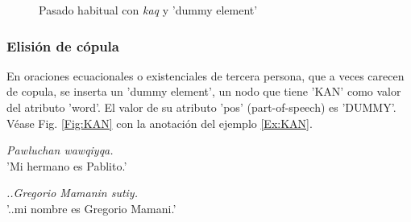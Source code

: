 \documentclass[a4paper,11pt,DIV12]{scrartcl}
\begin{document}
\begin{figure}
 \begin{center}
\end{center}
\caption{Pasado habitual con {\em kaq} y 'dummy element'}\label{Fig:kaqKAN}
\end{figure}





\subsubsection{Elisi\'on de c\'opula}
En oraciones ecuacionales o existenciales de tercera persona, que a veces carecen de copula, se inserta un 'dummy element', un nodo que tiene 'KAN' como valor del atributo 'word'. El valor de su atributo 'pos' (part-of-speech) es 'DUMMY'. V\'ease Fig. \ref{Fig:KAN} con la anotaci\'on del ejemplo \ref{Ex:KAN}.

\begin{examples}
 \item {\em Pawluchan wawqiyqa.}\\
      'Mi hermano es Pablito.'\\
 	\hfill{\small \citep[93]{Cusi2}}
 \item\label{Ex:KAN} {\em ..Gregorio Mamanin sutiy.}\\
      '..mi nombre es Gregorio Mamani.'\\
     	\hfill{\small \citep{Valderrama77}}
\end{examples}
\end{document}
